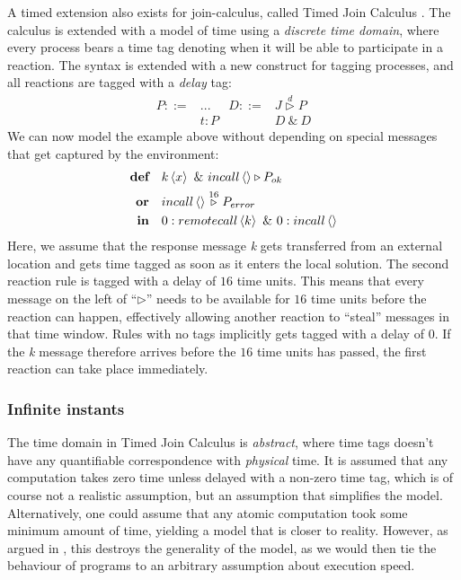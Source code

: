 A timed extension also exists for join-calculus, called Timed Join
Calculus \cite{timed-join}. The calculus is extended with a model of
time using a \emph{discrete time domain}, where every process bears a
time tag denoting when it will be able to participate in a reaction.
The syntax is extended with a new construct for tagging processes,
and all reactions are tagged with a
\emph{delay} tag:
\begin{align*}
  P ::={} & ...    & D ::={}& J \stackrel{d}{\triangleright} P \\
          & t : P  &        & D ~\&~ D
\end{align*}
We can now model the example above without depending on special
messages that get captured by the environment:
\begin{align*}
  \textbf{def}\quad & \atm k<x> ~\&~ \atm incall<> \triangleright P_{ok} \\
  \mathbf{or}\quad & \atm incall<> \stackrel{16}{\triangleright} P_{error} \\
  \textbf{in}\quad & \atm 0:remotecall<k> ~\&~ \atm 0:incall<>
\end{align*}
Here, we assume that the response message \emph{k} gets transferred
from an external location and gets time tagged as soon as it enters
the local solution.  The second reaction rule is tagged with a delay
of $16$ time units.  This means that every message on the left of
``$\triangleright$'' needs to be available for $16$ time units before
the reaction can happen, effectively allowing another reaction to
``steal'' messages in that time window. Rules with no tags implicitly
gets tagged with a delay of $0$. If the \emph{k} message therefore
arrives before the $16$ time units has passed, the first reaction can
take place immediately.


\subsubsection{Infinite instants}

The time domain in Timed Join Calculus is \emph{abstract}, where time
tags doesn't have any quantifiable correspondence with \emph{physical}
time. It is assumed that any computation takes zero time unless
delayed with a non-zero time tag, which is of course not a realistic
assumption, but an assumption that simplifies the model.
Alternatively, one could assume that any atomic computation took some
minimum amount of time, yielding a model that is closer to reality.
However, as argued in \cite{nicollin-overview}, this destroys the
generality of the model, as we would then tie the behaviour of programs
to an arbitrary assumption about execution speed.

